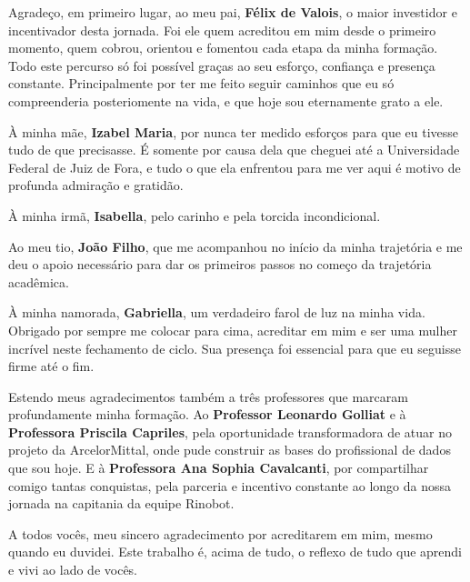 \documentclass[
        oneside,      %
        english,			
        brazil			 
        ]{abntbibufjf}
\begin{document}
 
\begin{agradecimentos}

Agradeço, em primeiro lugar, ao meu pai, \textbf{Félix de Valois}, o maior investidor e incentivador desta jornada. Foi ele quem acreditou em mim desde o primeiro momento, quem cobrou, orientou e fomentou cada etapa da minha formação. Todo este percurso só foi possível graças ao seu esforço, confiança e presença constante. Principalmente por ter me feito seguir caminhos que eu só compreenderia posteriomente na vida, e que hoje sou eternamente grato a ele.

À minha mãe, \textbf{Izabel Maria}, por nunca ter medido esforços para que eu tivesse tudo de que precisasse. É somente por causa dela que cheguei até a Universidade Federal de Juiz de Fora, e tudo o que ela enfrentou para me ver aqui é motivo de profunda admiração e gratidão.  

À minha irmã, \textbf{Isabella}, pelo carinho e pela torcida incondicional.  

Ao meu tio, \textbf{João Filho}, que me acompanhou no início da minha trajetória e me deu o apoio necessário para dar os primeiros passos no começo da trajetória acadêmica.  

À minha namorada, \textbf{Gabriella}, um verdadeiro farol de luz na minha vida. Obrigado por sempre me colocar para cima, acreditar em mim e ser uma mulher incrível neste fechamento de ciclo. Sua presença foi essencial para que eu seguisse firme até o fim.  

Estendo meus agradecimentos também a três professores que marcaram profundamente minha formação. Ao \textbf{Professor Leonardo Golliat} e à \textbf{Professora Priscila Capriles}, pela oportunidade transformadora de atuar no projeto da ArcelorMittal, onde pude construir as bases do profissional de dados que sou hoje. E à \textbf{Professora Ana Sophia Cavalcanti}, por compartilhar comigo tantas conquistas, pela parceria e incentivo constante ao longo da nossa jornada na capitania da equipe Rinobot.  

A todos vocês, meu sincero agradecimento por acreditarem em mim, mesmo quando eu duvidei. Este trabalho é, acima de tudo, o reflexo de tudo que aprendi e vivi ao lado de vocês.

\end{agradecimentos}

\end{document}
